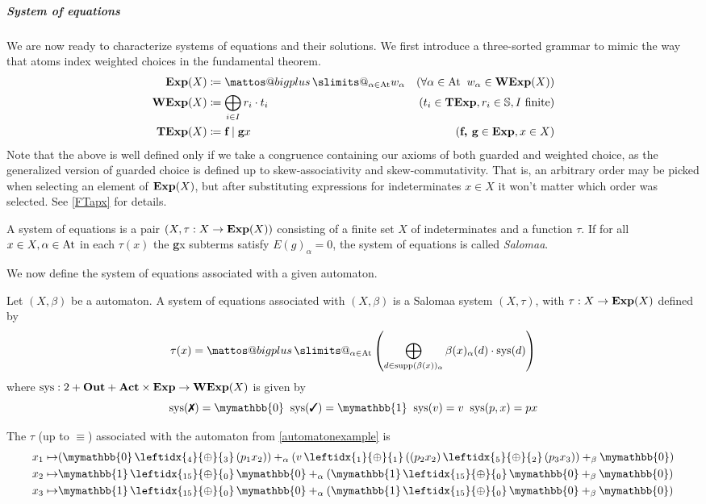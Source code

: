 \documentclass[a4paper,UKenglish,cleveref, autoref, thm-restate]{lipics-v2021}
\makeatletter
\newcommand{\cmark}{\text{\ding{51}}}
\newcommand{\xmark}{\text{\ding{55}}}
\newcommand{\Out}{\textbf{\upshape{Out}}}
\newcommand{\Act}{\textbf{\upshape{Act}}}
\newcommand{\At}{\text{\upshape{At}}}
\newcommand{\Exp}{\textbf{\upshape{Exp}}}
\newcommand{\WExp}{\textbf{\upshape{WExp}}}
\newcommand{\TExp}{\textbf{\upshape{TExp}}}
\newcommand{\WC}[2]{\,\leftidx{_{#1}}{{\oplus}}{_{#2}}\,}
\newcommand{\bskip}{\mymathbb{1}}
\newcommand{\babort}{\mymathbb{0}}
\newcommand{\wgkat}{\textsf{\upshape{wGKAT}}\xspace}
\theoremstyle{plain}\newtheoremrep{thm}{Theorem}[section]
\newcommand{\bigplus}{\DOTSB\mathop{\mathpalette\mattos@bigplus\relax}\slimits@
}
\newcommand\mattos@bigplus[2]{\vcenter{\hbox{\sbox\z@{$#1\sum$}\resizebox{!}{0.9\dimexpr\ht\z@+\dp\z@}{\raisebox{\depth}{$\m@th#1+$}}}}\vphantom{\sum}}
\makeatother
\begin{document}
	\subparagraph*{System of equations} We are now ready to characterize systems of equations and their solutions. We first introduce a three-sorted grammar to mimic the way that atoms index weighted choices in the fundamental theorem.
	\begin{align*}
		\Exp(X) &\coloneq \bigplus_{\alpha \in \At}w_\alpha & (\forall \alpha \in \At \;\; w_\alpha \in \WExp(X))\\
		\WExp(X) &\coloneq \bigoplus_{i \in I} r_i \cdot t_i &(t_i \in \TExp, r_i \in \mathbb S, I \text{ finite})\\
		\TExp(X) &\coloneq \textbf{f} \mid \textbf{g}x &(\textbf{f, g} \in \Exp, x \in X)
	\end{align*}
	Note that the above is well defined only if we take a congruence containing our axioms of both guarded and weighted choice, as the generalized version of guarded choice is defined up to skew-associativity and skew-commutativity. That is, an arbitrary order may be picked when selecting an element of $\Exp(X)$, but after substituting \wgkat expressions for indeterminates $x \in X$ it won't matter which order was selected. See \cref{FTapx} for details.
	\begin{defn}\label{salsys}
		A system of equations is a pair $(X, \tau: X \to \Exp(X))$ consisting of a finite set $X$ of indeterminates and a function $\tau$. If for all $x \in X, \alpha \in \At$ in each $\tau(x)$ the \textbf{g}x subterms satisfy $E(g)_\alpha = 0$, the system of equations is called \emph{Salomaa}.
	\end{defn}
	We now define the system of equations associated with a given \wgkat automaton.
	\begin{defn}
		Let $(X, \beta)$ be a \wgkat automaton. A system of equations associated with $(X, \beta)$ is a Salomaa system $(X, \tau)$, with $\tau: X \to \Exp(X)$ defined by
		 $$
			\tau(x) = \bigplus_{\alpha \in \At}\left(\bigoplus_{d \in \text{supp}(\beta(x))_\alpha} \beta(x)_\alpha(d)\cdot \text{sys}(d)\right)
		$$ 
		where $\text{sys}: 2+\Out+\Act\times\Exp \to \WExp(X)$ is given by
		 $$
			\text{sys}(\xmark) = \babort\;\;\text{sys}(\cmark)=\bskip\;\; \text{sys}(v) = v\;\;\text{sys}(p, x) = px
		$$
	\end{defn}
	\begin{exmp}
		The $\tau$ (up to $\equiv$) associated with the automaton from \cref{automatonexample} is
		\begin{align*}
			x_1 \mapsto& (\babort \WC{4}{3} (p_1x_2)) +_\alpha (v \WC{1}{1} ((p_2x_2)\WC{5}{2}(p_3x_3))+_\beta \babort) \\
			x_2 \mapsto& \bskip \WC{15}{0} \babort +_\alpha (\bskip \WC{15}{0} \babort +_\beta \babort)\\
			x_3 \mapsto& \bskip \WC{15}{0} \babort +_\alpha (\bskip \WC{15}{0} \babort +_\beta \babort)
		\end{align*} \label{systemofequations} \vspace{-.5cm}
	\end{exmp}
\end{document}

